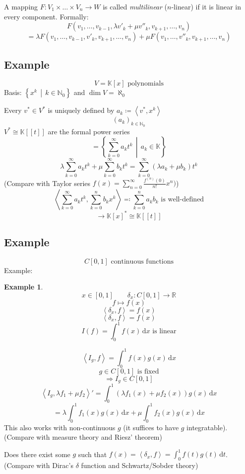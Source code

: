 \documentclass[a4paper,landscape,twocolumn]{article}
\newcommand\setdef[2]{\left\{#1\,\middle|\,#2\right\}}
\newcommand\functional[1]{\left\langle{#1}\right\rangle}
\theoremstyle{definition}
\newtheorem{ex}{Example}
\begin{document}
A mapping $F: V_1 \times \ldots \times V_n \to W$ is called \emph{multilinear} ($n$-linear)
if it is linear in every component. Formally:
\[
  F(v_1, \ldots, v_{k-1}, \lambda v'_k + \mu v''_k, v_{k+1}, \ldots, v_n)
\] \[
    = \lambda F(v_1, \ldots, v_{k-1}, v'_k, v_{k+1}, \ldots, v_n) + \mu F(v_1, \ldots, v''_k, v_{k+1}, \ldots, v_n)
\]

\subsection{Example}
\label{ex-5.28}
%
\[ V = \mathbb K[x] \text{ polynomials} \]
Basis: $\setdef{x^k}{k \in \mathbb N_0}$ and $\dim{V} = \aleph_0$

Every $v^* \in V^*$ is uniquely defined by $a_k \coloneqq \functional{v^*, x^k}$
\[ (a_k)_{k \in \mathbb N_0} \]
$V^* \cong \mathbb K[[t]]$ are the formal power series
\[ = \setdef{\sum_{k=0}^\infty a_k t^k}{a_k \in \mathbb K} \]
\[ \lambda \sum_{k=0}^\infty a_k t^k + \mu \sum_{k=0}^\infty b_k t^k = \sum_{k=0}^\infty (\lambda a_k + \mu b_k) t^k \]
(Compare with Taylor series $f(x) = \sum_{n=0}^\infty \frac{f^{(n)}(0)}{n!} x^n)$)
\[ \functional{\sum_{k=0}^\infty a_k t^k, \sum_{k=0}^n b_k x^k} \eqqcolon \sum_{k=0}^n a_k b_k \text{ is well-defined} \]
\[ \rightarrow \mathbb K[x]^* \cong \mathbb K[[t]] \]

\subsection{Example}
\label{ex-5.29}
\[ C[0,1] \text{ continuous functions} \]
Example:
\begin{ex}
\[ x \in [0,1] \qquad \delta_{x}: C[0,1] \to \mathbb R \]
\[ f \mapsto f(x) \]
\[ \functional{\delta_x, f} = f(x) \]
\[ \functional{\delta_x, f} = f(x) \]
\[ I(f) = \int_0^1 f(x) \, \text{d}x \text{ is linear} \]
\end{ex}

\[ \functional{I_g,f} = \int_0^1 f(x) g(x) \, \text{d}x \]
\[ g \in C[0,1] \text{ is fixed} \]
\[ \Rightarrow I_g \in C[0,1] \]
\[
  \functional{I_g, \lambda f_1 + \mu f_2}' = \int_0^1 (\lambda f_1(x) + \mu f_2(x)) g(x) \,\text{d}x
\] \[
  = \lambda \int_0^1 f_1(x) g(x) \,\text{d}x + \mu \int_0^1 f_2(x) g(x) \,\text{d}x
\]
This also works with non-continuous $g$ (it suffices to have $g$ integratable). (Compare with measure theory and Riesz' theorem)

Does there exist some $g$ such that $f(x) = \functional{\delta_x, f} = \int_0^1 f(t) g(t) \,\text{d}t$.
(Compare with Dirac's $\delta$ function and Schwartz/Sobder theory)
\end{document}
